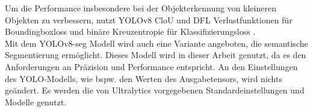 {{	Um die Performance insbesondere bei der Objekterkennung von kleineren Objekten zu verbessern, nutzt YOLOv8 CloU \citep{Zheng2020} und DFL \citep{Li2020} Verlustfunktionen für Boundingboxloss und binäre Kreuzentropie für Klassifizierungsloss \citep{Terven2023}. \\

	Mit dem YOLOv8-seg Modell wird auch eine Variante angeboten, die semantische Segmentierung ermöglicht. Dieses Modell wird in dieser Arbeit genutzt, da es den Anforderungen an Präzision und Performance entspricht. An den Einstellungen des YOLO-Modells, wie bspw. den Werten des Ausgabetensors, wird nichts geändert. Es werden die von Ultralytics vorgegebenen Standardeinstellungen und Modelle genutzt.
	}
}
